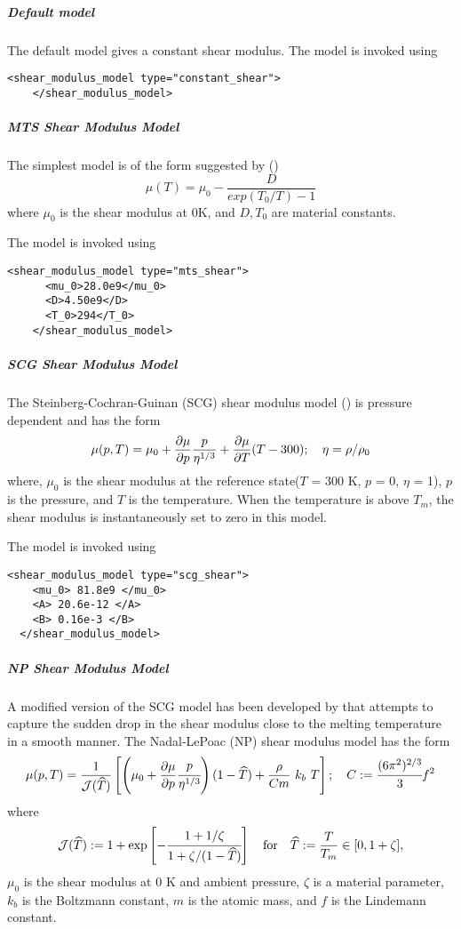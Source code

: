   \subparagraph{Default model}
  The default model gives a constant shear modulus.  The model is
  invoked using
  \begin{Verbatim}[fontsize=\footnotesize]
    <shear_modulus_model type="constant_shear">
    </shear_modulus_model>
  \end{Verbatim}

  \subparagraph{MTS Shear Modulus Model}
  The simplest model is of the form suggested by \cite{Varshni70}
  (\cite{Chen96})
  \begin{equation} \label{eq:MTSShear}
    \mu(T) = \mu_0 - \frac{D}{exp(T_0/T) - 1}
  \end{equation}
  where $\mu_0$ is the shear modulus at 0K, and $D, T_0$ are material
  constants.

  The model is invoked using
  \begin{Verbatim}[fontsize=\footnotesize]
    <shear_modulus_model type="mts_shear">
      <mu_0>28.0e9</mu_0>
      <D>4.50e9</D>
      <T_0>294</T_0>
    </shear_modulus_model>
  \end{Verbatim}

  \subparagraph{SCG Shear Modulus Model}
  The Steinberg-Cochran-Guinan (SCG) shear modulus
  model (\cite{Steinberg80,Zocher00}) is pressure dependent and
  has the form
  \begin{equation} \label{eq:SCGShear}
    \mu(p,T) = \mu_0 + \Partial{\mu}{p} \frac{p}{\eta^{1/3}} +
         \Partial{\mu}{T}(T - 300) ; \quad
    \eta = \rho/\rho_0
  \end{equation}
  where, $\mu_0$ is the shear modulus at the reference state($T$ = 300 K,
  $p$ = 0, $\eta$ = 1), $p$ is the pressure, and $T$ is the temperature.
  When the temperature is above $T_m$, the shear modulus is instantaneously
  set to zero in this model.

  The model is invoked using
  \begin{Verbatim}[fontsize=\footnotesize]
  <shear_modulus_model type="scg_shear">
    <mu_0> 81.8e9 </mu_0>
    <A> 20.6e-12 </A>
    <B> 0.16e-3 </B>
  </shear_modulus_model>
  \end{Verbatim}

  \subparagraph{NP Shear Modulus Model}
  A modified version of the SCG model has been developed by
  \cite{Nadal03} that attempts to capture the sudden drop in the
  shear modulus close to the melting temperature in a smooth manner.
  The Nadal-LePoac (NP) shear modulus model has the form
  \begin{equation} \label{eq:NPShear}
    \mu(p,T) = \frac{1}{\mathcal{J}(\That)}
      \left[
        \left(\mu_0 + \Partial{\mu}{p} \cfrac{p}{\eta^{1/3}} \right)
        (1 - \That) + \frac{\rho}{Cm}~k_b~T\right]; \quad
    C := \cfrac{(6\pi^2)^{2/3}}{3} f^2
  \end{equation}
  where
  \begin{equation}
    \mathcal{J}(\That) := 1 + \exp\left[-\cfrac{1+1/\zeta}
        {1+\zeta/(1-\That)}\right] \quad
       \text{for} \quad \That:=\frac{T}{T_m}\in[0,1+\zeta],
  \end{equation}
  $\mu_0$ is the shear modulus at 0 K and ambient pressure, $\zeta$ is
  a material parameter, $k_b$ is the Boltzmann constant, $m$ is the atomic
  mass, and $f$ is the Lindemann constant.

